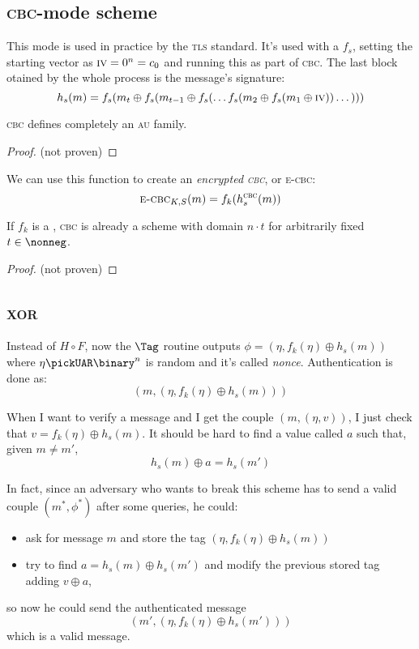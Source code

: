 \subsection{\textsc{cbc}-mode \mac{} scheme}
This mode is used in practice by the \textsc{tls} standard. It's used with a \prf{} $f_s$, setting the starting vector as $\textsc{iv} = 0^n = c_0$ and running this \prf{} as part of \textsc{cbc}. The last block otained by the whole process is the message's signature:
\[
    h_s(m) = f_s(m_t \oplus f_s(m_{t-1} \oplus f_s(\dots f_s(m_2 \oplus f_s(m_1 \oplus \textsc{iv})) \dots)))
\]
\begin{lemma}
    \textsc{cbc} \mac{} defines completely an \textsc{au} family.
\end{lemma}

\begin{proof}
    (not proven)
\end{proof}

We can use this function to create an \emph{encrypted \textsc{cbc}}, or \textsc{e-cbc}:
\[
    \textsc{e-cbc}_{K, S}(m) = f_{k}(h_s^{\textsc{cbc}}(m))
\]

\begin{theorem}
    If $f_k$ is a \prf, \textsc{cbc} \mac{} is already a \mac{} scheme with domain $n \cdot t$ for arbitrarily fixed $t \in \nonneg$.
\end{theorem}

\begin{proof}
    (not proven)
\end{proof}

\subsection{\textsc{xor} \mac}
Instead of $H \circ F$, now the $\Tag$ routine outputs $\phi = (\eta , f_k(\eta) \oplus h_s(m))$ where $\eta \pickUAR \binary^n$ is random and it's called \textit{nonce}. Authentication is done as:
\[
    (m, (\eta, f_k(\eta) \oplus h_s(m)))
\]

When I want to verify a message and I get the couple $(m, (\eta, v))$, I just check that $v = f_k(\eta) \oplus h_s(m)$. It should be hard to find a value called $a$ such that, given $m \neq m'$, 
\[
    h_s(m) \oplus a = h_s(m')
\]

In fact, since an adversary who wants to break this scheme has to send a valid couple $(m^*, \phi^*)$ after some queries, he could:
\begin{itemize}
    \item ask for message $m$ and store the tag $(\eta, f_k(\eta) \oplus h_s(m))$
    \item try to find $a = h_s(m) \oplus h_s(m')$ and modify the previous stored tag adding $v \oplus a$, 
\end{itemize}
so now he could send the authenticated message
\[
    (m', (\eta, f_k(\eta) \oplus h_s(m'))) 
\]
which is a valid message.

